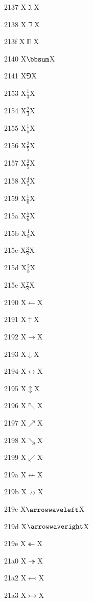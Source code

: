 \documentclass[11pt]{article}
\begin{document}
2137 X{\ensuremath{\gimel}}X

2138 X{\ensuremath{\daleth}}X

213f X{\ensuremath{\BbbPi}}X

2140 X{\ensuremath{\bbsum}}X

2141 X{\ensuremath{\Game}}X

2153 X{\ensuremath{\frac{1}{3}}}X

2154 X{\ensuremath{\frac{2}{3}}}X

2155 X{\ensuremath{\frac{1}{5}}}X

2156 X{\ensuremath{\frac{2}{5}}}X

2157 X{\ensuremath{\frac{3}{5}}}X

2158 X{\ensuremath{\frac{4}{5}}}X

2159 X{\ensuremath{\frac{1}{6}}}X

215a X{\ensuremath{\frac{5}{6}}}X

215b X{\ensuremath{\frac{1}{8}}}X

215c X{\ensuremath{\frac{3}{8}}}X

215d X{\ensuremath{\frac{5}{8}}}X

215e X{\ensuremath{\frac{7}{8}}}X

2190 X{\ensuremath{\leftarrow}}X

2191 X{\ensuremath{\uparrow}}X

2192 X{\ensuremath{\rightarrow}}X

2193 X{\ensuremath{\downarrow}}X

2194 X{\ensuremath{\leftrightarrow}}X

2195 X{\ensuremath{\updownarrow}}X

2196 X{\ensuremath{\nwarrow}}X

2197 X{\ensuremath{\nearrow}}X

2198 X{\ensuremath{\searrow}}X

2199 X{\ensuremath{\swarrow}}X

219a X{\ensuremath{\nleftarrow}}X

219b X{\ensuremath{\nrightarrow}}X

219c X{\ensuremath{\arrowwaveleft}}X

219d X{\ensuremath{\arrowwaveright}}X

219e X{\ensuremath{\twoheadleftarrow}}X

21a0 X{\ensuremath{\twoheadrightarrow}}X

21a2 X{\ensuremath{\leftarrowtail}}X

21a3 X{\ensuremath{\rightarrowtail}}X
\end{document}
